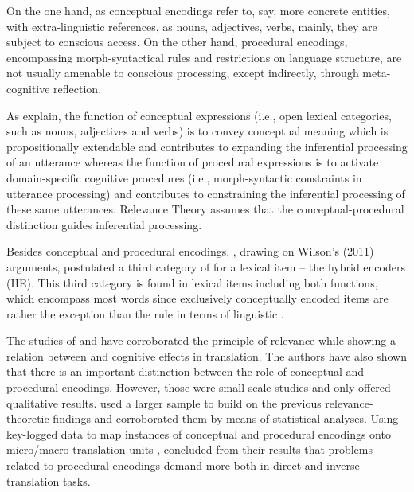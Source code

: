 \documentclass[output=paper]{langsci/langscibook}
\begin{document}
On the one hand, as conceptual encodings refer to, say, more concrete entities, with extra-linguistic references, as nouns, adjectives, verbs, mainly, they are subject to conscious access. On the other hand, procedural encodings, encompassing morph-syntactical rules and restrictions on language structure, are not usually amenable to conscious processing, except indirectly, through meta-cognitive reflection. 



As \citet{Alves2014} explain, the function of conceptual expressions (i.e., open lexical categories, such as nouns, adjectives and verbs) is to convey conceptual meaning which is propositionally extendable and contributes to expanding the inferential processing of an utterance whereas the function of procedural expressions is to activate domain-specific cognitive procedures (i.e., morph-syntactic constraints in utterance processing) and contributes to constraining the inferential processing of these same utterances. Relevance Theory assumes that the conceptual-procedural distinction guides inferential processing. \citep[155]{Alves2014}  



Besides conceptual and procedural encodings, \citet{alves2013}, drawing on Wilson's (2011) arguments, postulated a third category of  for a lexical item -- the hybrid encoders (HE). This third category is found in lexical items including both  functions, which encompass most words since exclusively conceptually encoded items are rather the exception than the rule in terms of linguistic .



The studies of \citet{alves2007cognitive} and \citet{alves2003} have corroborated the principle of relevance while showing a relation between  and cognitive effects in translation. The authors have also shown that there is an important distinction between the role of conceptual and procedural encodings.  However, those were small-scale studies and only offered qualitative results. \citet{alves2013} used a larger sample to build on the previous relevance-theoretic findings and corroborated them by means of statistical analyses. Using key-logged data to map instances of conceptual and procedural encodings onto micro/macro translation units \citep{alves2009, alves2011}, \citet{alves2013} concluded from their results that problems related to procedural encodings demand more  both in direct and inverse translation tasks.
\end{document}
